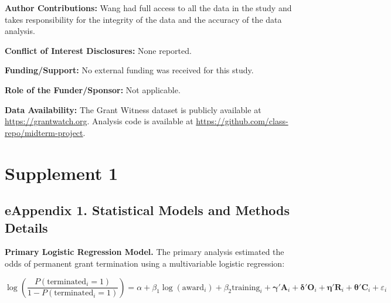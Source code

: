 \documentclass[10pt, letterpaper]{article}
\begin{document}
\vspace{6pt}
\noindent{\color{jamalightgray}\rule{\textwidth}{0.4pt}}
\vspace{4pt}

\noindent\textbf{Author Contributions:} Wang had full access to all the data in the study and takes responsibility for the integrity of the data and the accuracy of the data analysis.

\noindent\textbf{Conflict of Interest Disclosures:} None reported.

\noindent\textbf{Funding/Support:} No external funding was received for this study.

\noindent\textbf{Role of the Funder/Sponsor:} Not applicable.

\noindent\textbf{Data Availability:} The Grant Witness dataset is publicly available at \url{https://grantwatch.org}. Analysis code is available at \url{https://github.com/class-repo/midterm-project}.



{\fontsize{8.5}{10.5}\selectfont


}


\clearpage
\section*{Supplement 1}

\subsection*{eAppendix 1. Statistical Models and Methods Details}

\textbf{Primary Logistic Regression Model.}
The primary analysis estimated the odds of permanent grant termination using a multivariable logistic regression:

\[
\log\!\left(\frac{P(\text{terminated}_{i}=1)}{1-P(\text{terminated}_{i}=1)}\right) = \alpha + \beta_1 \log(\text{award}_{i}) + \beta_2 \text{training}_{i} + \boldsymbol{\gamma}'\mathbf{A}_{i} + \boldsymbol{\delta}'\mathbf{O}_{i} + \boldsymbol{\eta}'\mathbf{R}_{i} + \boldsymbol{\theta}'\mathbf{C}_{i} + \varepsilon_{i}
\]
\end{document}
